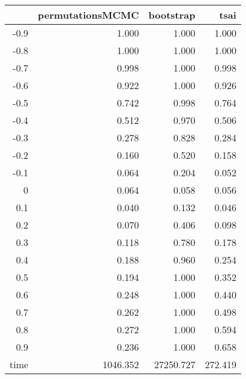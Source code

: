 \begin{table}[ht]
\centering
\begingroup\tiny
\begin{tabular}{rrrr}
  \hline
 & permutationsMCMC & bootstrap & tsai \\ 
  \hline
-0.9 & 1.000 & 1.000 & 1.000 \\ 
  -0.8 & 1.000 & 1.000 & 1.000 \\ 
  -0.7 & 0.998 & 1.000 & 0.998 \\ 
  -0.6 & 0.922 & 1.000 & 0.926 \\ 
  -0.5 & 0.742 & 0.998 & 0.764 \\ 
  -0.4 & 0.512 & 0.970 & 0.506 \\ 
  -0.3 & 0.278 & 0.828 & 0.284 \\ 
  -0.2 & 0.160 & 0.520 & 0.158 \\ 
  -0.1 & 0.064 & 0.204 & 0.052 \\ 
  0 & 0.064 & 0.058 & 0.056 \\ 
  0.1 & 0.040 & 0.132 & 0.046 \\ 
  0.2 & 0.070 & 0.406 & 0.098 \\ 
  0.3 & 0.118 & 0.780 & 0.178 \\ 
  0.4 & 0.188 & 0.960 & 0.254 \\ 
  0.5 & 0.194 & 1.000 & 0.352 \\ 
  0.6 & 0.248 & 1.000 & 0.440 \\ 
  0.7 & 0.262 & 1.000 & 0.498 \\ 
  0.8 & 0.272 & 1.000 & 0.594 \\ 
  0.9 & 0.236 & 1.000 & 0.658 \\ 
  time & 1046.352 & 27250.727 & 272.419 \\ 
   \hline
\end{tabular}
\endgroup
\end{table}

